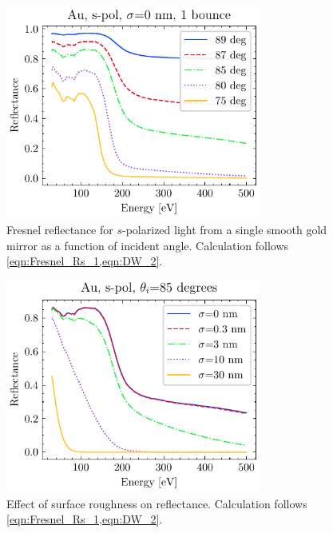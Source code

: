 \begin{figure}
	\centering
	\includegraphics[width=0.75\textwidth]{figures/chap2/Au_ReflvsAngle.pdf}
	\caption{Fresnel reflectance for $s$-polarized light from a single smooth gold mirror as a function of incident angle. Calculation follows \cref{eqn:Fresnel_Rs_1,eqn:DW_2}.}
	\label{fig:Au_ReflvsAngle}
\end{figure}

\begin{figure}
	\centering
	\includegraphics[width=0.75\textwidth]{figures/chap2/R_vs_roughness.pdf}
	\caption{Effect of surface roughness on reflectance. Calculation follows \cref{eqn:Fresnel_Rs_1,eqn:DW_2}.}
	\label{fig:R_vs_roughness.png}
\end{figure}

